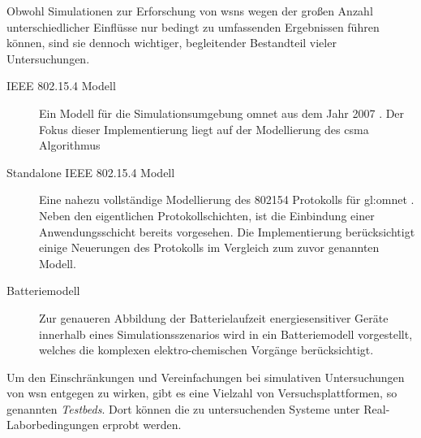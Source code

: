 Obwohl Simulationen zur Erforschung von \acp{wsn} wegen der großen Anzahl unterschiedlicher Einflüsse nur bedingt zu umfassenden Ergebnissen führen können, sind sie dennoch wichtiger, begleitender Bestandteil vieler Untersuchungen.
\begin{description}

\item[IEEE 802.15.4 Modell] Ein Modell für die Simulationsumgebung \acs{omnet} aus dem Jahr 2007 \citep{oldmodel}. Der Fokus dieser Implementierung liegt auf der Modellierung des \acs{csma} Algorithmus

\item[Standalone IEEE 802.15.4 Modell] Eine nahezu vollständige Modellierung des \gls{802154} Protokolls für \gls{gl:omnet} \cite{model}. Neben den eigentlichen Protokollschichten, ist die Einbindung einer Anwendungsschicht bereits vorgesehen. Die Implementierung berücksichtigt einige Neuerungen des Protokolls im Vergleich zum zuvor genannten Modell.

\item[Batteriemodell] Zur genaueren Abbildung der Batterielaufzeit energiesensitiver Geräte innerhalb eines Simulationsszenarios wird in \cite{batterymodel} ein Batteriemodell vorgestellt, welches die komplexen elektro-chemischen Vorgänge berücksichtigt.

\end{description}
Um den Einschränkungen und Vereinfachungen bei simulativen Untersuchungen von \acs{wsn} entgegen zu wirken, gibt es eine Vielzahl von Versuchsplattformen, so genannten \emph{Testbeds}. Dort können die zu untersuchenden Systeme unter Real- \bzw Laborbedingungen erprobt werden.
